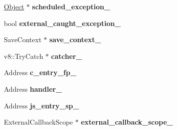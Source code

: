 \begin{DoxyCompactItemize}
\item 
\hypertarget{classv8_1_1internal_1_1_b_a_s_e___e_m_b_e_d_d_e_d_a6b872551adc18cc89a654d23652a4671}{}\hyperlink{classv8_1_1internal_1_1_object}{Object} $\ast$ {\bfseries scheduled\+\_\+exception\+\_\+}\label{classv8_1_1internal_1_1_b_a_s_e___e_m_b_e_d_d_e_d_a6b872551adc18cc89a654d23652a4671}

\item 
\hypertarget{classv8_1_1internal_1_1_b_a_s_e___e_m_b_e_d_d_e_d_a260b082d8ce8bb003140f1bd4114d0d1}{}bool {\bfseries external\+\_\+caught\+\_\+exception\+\_\+}\label{classv8_1_1internal_1_1_b_a_s_e___e_m_b_e_d_d_e_d_a260b082d8ce8bb003140f1bd4114d0d1}

\item 
\hypertarget{classv8_1_1internal_1_1_b_a_s_e___e_m_b_e_d_d_e_d_af2286ee567ea403474e6ec55151eb3cf}{}Save\+Context $\ast$ {\bfseries save\+\_\+context\+\_\+}\label{classv8_1_1internal_1_1_b_a_s_e___e_m_b_e_d_d_e_d_af2286ee567ea403474e6ec55151eb3cf}

\item 
\hypertarget{classv8_1_1internal_1_1_b_a_s_e___e_m_b_e_d_d_e_d_a14e6d8b91991ae3deeaf780ee8a4a670}{}v8\+::\+Try\+Catch $\ast$ {\bfseries catcher\+\_\+}\label{classv8_1_1internal_1_1_b_a_s_e___e_m_b_e_d_d_e_d_a14e6d8b91991ae3deeaf780ee8a4a670}

\item 
\hypertarget{classv8_1_1internal_1_1_b_a_s_e___e_m_b_e_d_d_e_d_afbdea098edac45f15436b8a44231a4c5}{}Address {\bfseries c\+\_\+entry\+\_\+fp\+\_\+}\label{classv8_1_1internal_1_1_b_a_s_e___e_m_b_e_d_d_e_d_afbdea098edac45f15436b8a44231a4c5}

\item 
\hypertarget{classv8_1_1internal_1_1_b_a_s_e___e_m_b_e_d_d_e_d_af1be0aa8db77e0ced0fcdd3c26ab3b5e}{}Address {\bfseries handler\+\_\+}\label{classv8_1_1internal_1_1_b_a_s_e___e_m_b_e_d_d_e_d_af1be0aa8db77e0ced0fcdd3c26ab3b5e}

\item 
\hypertarget{classv8_1_1internal_1_1_b_a_s_e___e_m_b_e_d_d_e_d_a21375aee643eb2717effaf1a075ba0b7}{}Address {\bfseries js\+\_\+entry\+\_\+sp\+\_\+}\label{classv8_1_1internal_1_1_b_a_s_e___e_m_b_e_d_d_e_d_a21375aee643eb2717effaf1a075ba0b7}

\item 
\hypertarget{classv8_1_1internal_1_1_b_a_s_e___e_m_b_e_d_d_e_d_a2addbdc9478d7eb6e734c068b2f4864f}{}External\+Callback\+Scope $\ast$ {\bfseries external\+\_\+callback\+\_\+scope\+\_\+}\label{classv8_1_1internal_1_1_b_a_s_e___e_m_b_e_d_d_e_d_a2addbdc9478d7eb6e734c068b2f4864f}


\end{DoxyCompactItemize}
